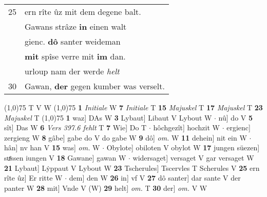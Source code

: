 \documentclass[8pt,a4paper,notitlepage]{article}
\begin{document}
\begin{table}[ht]
\begin{minipage}[t]{0.5\linewidth}
\begin{tabular}{rl}
25 & ern rîte ûz mit dem degene balt.\\ 
 & Gawans strâze \textbf{in} einen walt\\ 
 & gienc. \textbf{dô} santer weideman\\ 
 & \textbf{mit} spîse verre mit \textbf{im} dan.\\ 
 & urloup nam der werde \textit{helt}\\ 
30 & Gawan, \textbf{der} gegen kumber was verselt.\\ 
\end{tabular}
\scriptsize
\line(1,0){75} \newline
T V W \newline
\line(1,0){75} \newline
\textbf{1} \textit{Initiale} W  \textbf{7} \textit{Initiale} T  \textbf{15} \textit{Majuskel} T  \textbf{17} \textit{Majuskel} T  \textbf{23} \textit{Majuskel} T  \newline
\line(1,0){75} \newline
\textbf{1} waz] DAs W \textbf{3} Lybaut] Libaut V Lybout W  $\cdot$ nû] do V \textbf{5} sît] Das W \textbf{6} \textit{Vers 397.6 fehlt} T  \textbf{7} Wie] Do T  $\cdot$ hôchgezît] hochzit W  $\cdot$ ergienc] zergieng W \textbf{8} gâbe] gabe do V do gabe W \textbf{9} dô] \textit{om.} W \textbf{11} dehein] nit ein W  $\cdot$ hân] nv han V \textbf{15} was] \textit{om.} W  $\cdot$ Obylote] obiloten V obylot W \textbf{17} jungen süezen] suͤssen iungen V \textbf{18} Gawane] gawan W  $\cdot$ widersaget] versaget V gar versaget W \textbf{21} Lybaut] Lẏppaut V Lybout W \textbf{23} Tscherules] Tscervles T Scherules V \textbf{25} ern rîte ûz] Er ritte W  $\cdot$ dem] den W \textbf{26} in] vf V \textbf{27} dô santer] dar sante V der panter W \textbf{28} mit] Vnde V (W) \textbf{29} helt] \textit{om.} T \textbf{30} der] \textit{om.} V W \newline
\end{minipage}
\end{table}
\end{document}
